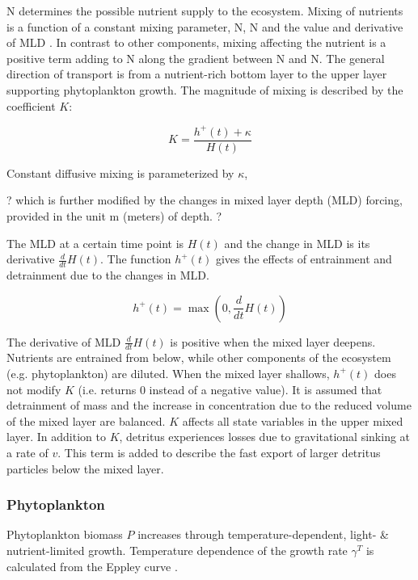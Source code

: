 \documentclass[template.tex]{subfiles}
\begin{document}
\unit{N^\emptyset} determines the possible nutrient supply to the ecosystem. Mixing of nutrients is a function of a constant mixing parameter, \unit{N^\emptyset}, N and the value and derivative of MLD \citep{Evans1985ACycles}. In contrast to other components, mixing affecting the nutrient is a positive term adding to N along the gradient between \unit{N^\emptyset} and N. The general direction of transport is from a nutrient-rich bottom layer to the upper layer supporting phytoplankton growth.
The magnitude of mixing is described by the coefficient $K$:

\begin{equation}
    K = \frac{h^{+}(t) + \kappa}{H(t)}
\end{equation}

Constant diffusive mixing is parameterized by $\kappa$, 

? which is further modified by the changes in mixed layer depth (MLD) forcing, provided in the unit \unit{m} (meters) of depth. ?

The MLD at a certain time point is $H(t)$ and the change in MLD is its derivative $\frac{d}{d t} H(t)$. The function $h^{+}(t)$ gives the effects of entrainment and detrainment due to the changes in MLD.

\begin{equation}
    h^{+}(t) = \max\left(0, \frac{d}{d t} H(t)\right)
\end{equation}

The derivative of MLD $\frac{d}{d t} H(t)$ is positive when the mixed layer deepens. Nutrients are entrained from below, while other components of the ecosystem (e.g. phytoplankton) are diluted. When the mixed layer shallows, $h^{+}(t)$ does not modify $K$ (i.e. returns 0 instead of a negative value). It is assumed that detrainment of mass and the increase in concentration due to the reduced volume of the mixed layer are balanced.
$K$ affects all state variables in the upper mixed layer. In addition to $K$, detritus experiences losses due to gravitational sinking at a rate of $v$. This term is added to describe the fast export of larger detritus particles below the mixed layer. 

\subsubsection{Phytoplankton}
Phytoplankton biomass $P$ increases through temperature-dependent, light- \& nutrient-limited growth. Temperature dependence of the  growth rate $\gamma^{T}$ is calculated from the Eppley curve \citep{Eppley1972TemperatureSea}.
\end{document}
